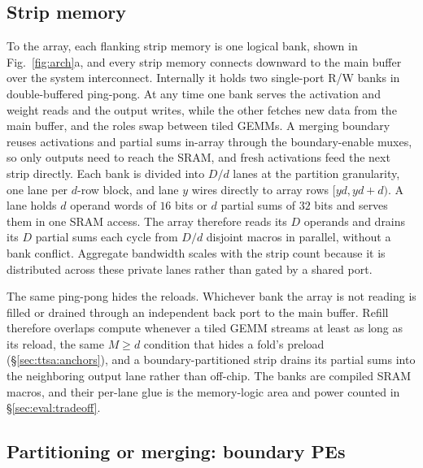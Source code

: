 \subsection{Strip memory}
\label{sec:design:mem}
To the array, each flanking strip memory is one logical bank,
shown in Fig.~\ref{fig:arch}a, and every strip memory connects
downward to the main buffer over the system interconnect.
Internally it holds two single-port R/W banks in double-buffered
ping-pong. At any time one bank serves the activation and weight
reads and the output writes, while the other fetches new data from the
main buffer, and the roles swap between tiled GEMMs. A merging boundary reuses activations and
partial sums in-array through the
boundary-enable muxes, so only outputs
need to reach the SRAM, and fresh activations feed the next strip
directly. Each bank is divided into $D/d$ lanes at the
partition granularity, one lane per $d$-row block, and lane $y$
wires directly to array rows $[yd, yd{+}d)$.
A lane holds $d$ operand words of $16$ bits or $d$ partial sums of
$32$ bits and serves them in one SRAM access. The array therefore
reads its $D$ operands and drains its $D$
partial sums each cycle from $D/d$ disjoint macros in parallel,
without a bank conflict. Aggregate bandwidth scales with the strip
count because it is distributed across these private lanes rather
than gated by a shared port.

The same ping-pong hides the reloads. Whichever bank the array is
not reading is filled or drained through an independent back port
to the main buffer. Refill therefore overlaps compute whenever a
tiled GEMM streams at least
as long as its reload, the same $M{\ge}d$ condition that hides a
fold's preload (\S\ref{sec:ttsa:anchors}), and a boundary-partitioned strip
drains its partial sums into the neighboring output lane rather than
off-chip. The banks are compiled SRAM
macros, and their per-lane glue is the memory-logic area and power
counted in \S\ref{sec:eval:tradeoff}.


\subsection{Partitioning or merging: boundary PEs}
\label{sec:design:boundary}
\label{sec:design:cut}

